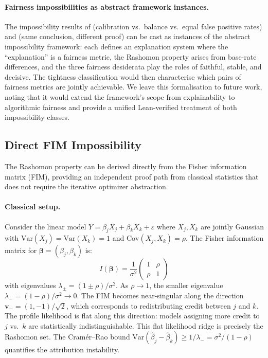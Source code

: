 \documentclass{article}
\newcommand{\Var}{\mathrm{Var}}
\begin{document}
\paragraph{Fairness impossibilities as abstract framework instances.}
The impossibility results of \citet{chouldechova2017fair} (calibration vs.\ balance vs.\ equal false positive rates) and \citet{kleinberg2017inherent} (same conclusion, different proof) can be cast as instances of the abstract impossibility framework: each defines an explanation system where the ``explanation'' is a fairness metric, the Rashomon property arises from base-rate differences, and the three fairness desiderata play the roles of faithful, stable, and decisive. The tightness classification would then characterise which pairs of fairness metrics are jointly achievable. We leave this formalisation to future work, noting that it would extend the framework's scope from explainability to algorithmic fairness and provide a unified Lean-verified treatment of both impossibility classes.

\subsection{Direct FIM Impossibility}
\label{sec:fim}

The Rashomon property can be derived directly from the Fisher information matrix (FIM), providing an independent proof path from classical statistics that does not require the iterative optimizer abstraction.

\paragraph{Classical setup.}
Consider the linear model $Y = \beta_j X_j + \beta_k X_k + \varepsilon$ where $X_j, X_k$ are jointly Gaussian with $\Var(X_j) = \Var(X_k) = 1$ and $\text{Cov}(X_j, X_k) = \rho$. The Fisher information matrix for $\boldsymbol{\beta} = (\beta_j, \beta_k)$ is:
\[
    I(\boldsymbol{\beta}) = \frac{1}{\sigma^2}\begin{pmatrix} 1 & \rho \\ \rho & 1 \end{pmatrix}
\]
with eigenvalues $\lambda_\pm = (1 \pm \rho)/\sigma^2$. As $\rho \to 1$, the smaller eigenvalue $\lambda_- = (1-\rho)/\sigma^2 \to 0$. The FIM becomes near-singular along the direction $\boldsymbol{v}_- = (1, -1)/\sqrt{2}$, which corresponds to redistributing credit between $j$ and $k$. The profile likelihood is flat along this direction: models assigning more credit to $j$ vs.\ $k$ are statistically indistinguishable. This flat likelihood ridge is precisely the Rashomon set. The Cram\'er--Rao bound $\Var(\hat\beta_j - \hat\beta_k) \geq 1/\lambda_- = \sigma^2/(1-\rho)$ quantifies the attribution instability.
\end{document}
